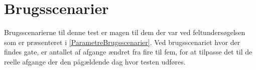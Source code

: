 \section{Brugsscenarier}
\label{TestAfSkalaBrugsscenarier}
%
Brugsscenarierne til denne test er magen til dem der var ved feltundersøgelsen som er præsenteret i \autoref{ParametreBrugsscenarier}. Ved brugsscenariet hvor der findes gate, er antallet af afgange ændret fra fire til fem, for at tilpasse det til de reelle afgange der den pågældende dag hvor testen udføres. 
